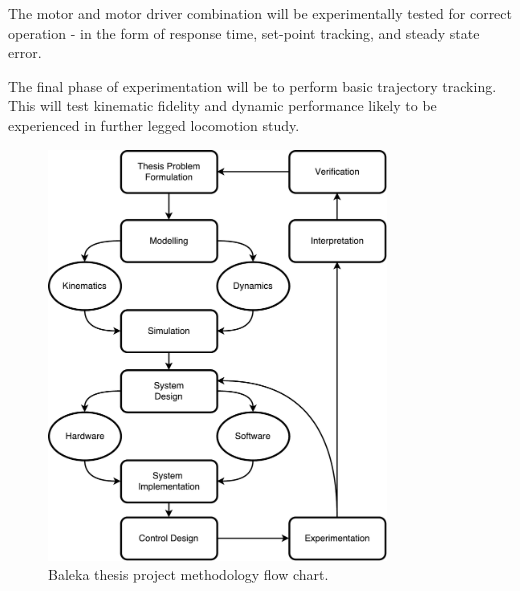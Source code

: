 The motor and motor driver combination will be experimentally tested for correct operation - in the form of response time, set-point tracking, and steady state error.

The final phase of experimentation will be to perform basic trajectory tracking. This will test kinematic fidelity and dynamic performance likely to be experienced in further legged locomotion study.

\begin{figure}[]
\centering
\includegraphics[width=0.8\textwidth]{images/introduction/project-plan-methodology.pdf} 
\caption{Baleka thesis project methodology flow chart.}
\label{fig:project-plan-methodology}
\end{figure}
